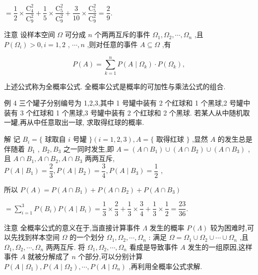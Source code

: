 $= \dfrac{1}{2} \times  \dfrac{{\mathrm{C}}_{4}^{2}}{{\mathrm{C}}_{9}^{2}} + \dfrac{1}{5} \times  \dfrac{{\mathrm{C}}_{5}^{2}}{{\mathrm{C}}_{9}^{2}} + \dfrac{3}{10} \times  \dfrac{{\mathrm{C}}_{5}^{2}}{{\mathrm{C}}_{9}^{2}} = \dfrac{2}{9}.$

注意 设样本空间 $\Omega$ 可分成 $n$ 个两两互斥的事件 ${\Omega }_{1},{\Omega }_{2},\cdots ,{\Omega }_{n}$ ,且 $P\left( {\Omega }_{i}\right)  > 0,i = 1,2$ , $\cdots ,n$ ,则对任意的事件 $A \subseteq  \Omega$ ,有

\[
P\left( A\right)  = \mathop{\sum }\limits_{{k = 1}}^{n}P\left( {A \mid  {\Omega }_{k}}\right)  \cdot  P\left( {\Omega }_{k}\right) ,
\]

上述公式称为全概率公式. 全概率公式是概率的可加性与乘法公式的组合.

例 4 三个罐子分别编号为 1,2,3,其中 1 号罐中装有 2 个红球和 1 个黑球,2 号罐中装有 3 个红球和 1 个黑球,3 号罐中装有 2 个红球和 2 个黑球. 若某人从中随机取一罐,再从中任意取出一球, 求取得红球的概率.

解 记 ${B}_{i} = \{$ 球取自 $i$ 号罐 $\} \left( {i = 1,2,3}\right) ,A = \{$ 取得红球 $\}$ ,显然 $A$ 的发生总是伴随着 ${B}_{1}$ , ${B}_{2},{B}_{3}$ 之一同时发生,即 $A = \left( {A \cap  {B}_{1}}\right)  \cup  \left( {A \cap  {B}_{2}}\right)  \cup  \left( {A \cap  {B}_{3}}\right)$ ,且 $A \cap  {B}_{1},A \cap  {B}_{2},A \cap  {B}_{3}$ 两两互斥, $P\left( {A \mid  {B}_{1}}\right)  = \dfrac{2}{3},P\left( {A \mid  {B}_{2}}\right)  = \dfrac{3}{4},P\left( {A \mid  {B}_{3}}\right)  = \dfrac{1}{2}$ ,

所以 $P\left( A\right)  = P\left( {A \cap  {B}_{1}}\right)  + P\left( {A \cap  {B}_{2}}\right)  + P\left( {A \cap  {B}_{3}}\right)$

$= \mathop{\sum }\limits_{{i = 1}}^{3}P\left( {B}_{i}\right) P\left( {A \mid  {B}_{i}}\right)  = \dfrac{1}{3} \times  \dfrac{2}{3} + \dfrac{1}{3} \times  \dfrac{3}{4} + \dfrac{1}{3} \times  \dfrac{1}{2} = \dfrac{23}{36}.$

注意 全概率公式的意义在于,当直接计算事件 $\Lambda$ 发生的概率 $P\left( \Lambda \right)$ 较为困难时,可以先找到样本空间 $\Omega$ 的一个划分 ${\Omega }_{1},{\Omega }_{2},\cdots ,{\Omega }_{n}$ : 满足 $\Omega  = {\Omega }_{1} \cup  {\Omega }_{2} \cup  \cdots  \cup  {\Omega }_{n}$ ,且 ${\Omega }_{1},{\Omega }_{2},\cdots ,{\Omega }_{n}$ 两两互斥. 将 ${\Omega }_{1},{\Omega }_{2},\cdots ,{\Omega }_{n}$ 看成是导致事件 $A$ 发生的一组原因,这样事件 $A$ 就被分解成了 $n$ 个部分,可以分别计算 $P\left( {A \mid  {\Omega }_{1}}\right) ,P\left( {A \mid  {\Omega }_{2}}\right) ,\cdots ,P\left( {A \mid  {\Omega }_{n}}\right)$ ,再利用全概率公式求解.

